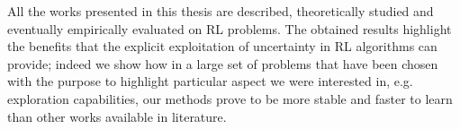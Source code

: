 All the works presented in this thesis are described, theoretically studied and eventually empirically evaluated on RL problems. The obtained results highlight the benefits that the explicit exploitation of uncertainty in RL algorithms can provide; indeed we show how in a large set of problems that have been chosen with the purpose to highlight particular aspect we were interested in, e.g. exploration capabilities, our methods prove to be more stable and faster to learn than other works available in literature.
